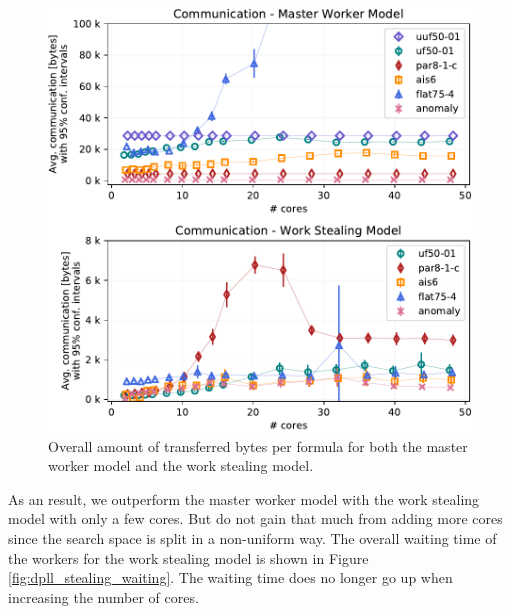 \documentclass[letterpaper]{article}
\begin{document}
\begin{figure}[p]
    \centering
    \includegraphics[width=\columnwidth]{figures/comm_subset_dpll_scaling_tar.pdf}
    \caption{Overall amount of transferred bytes per formula for both the master worker model and the work stealing model.}
    \label{fig:comm_reduce}
\end{figure}

As an result, we outperform the master worker model with the work stealing model with only a few cores.
But do not gain that much from adding more cores since the search space is split in a non-uniform way.
The overall waiting time of the workers for the work stealing model is shown in Figure \ref{fig:dpll_stealing_waiting}.
The waiting time does no longer go up when increasing the number of cores.
\end{document}

